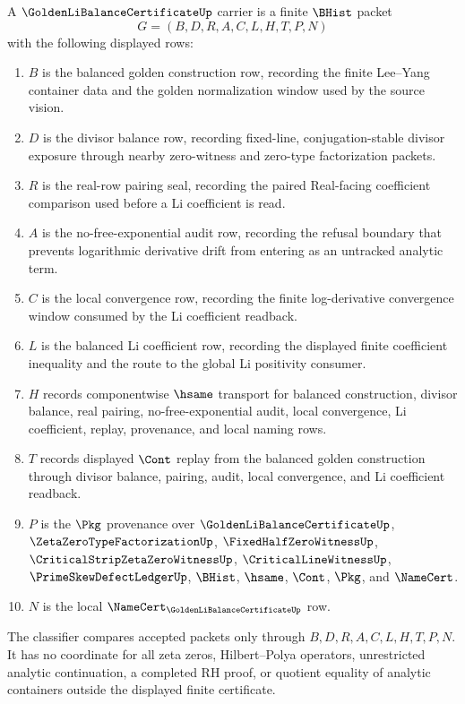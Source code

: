 \begin{definition}
\label{def:golden-li-balance-certificate-carrier}
A $\GoldenLiBalanceCertificateUp$ carrier is a finite $\BHist$ packet
$$
G=(B,D,R,A,C,L,H,T,P,N)
$$
with the following displayed rows:
\begin{enumerate}
\item $B$ is the balanced golden construction row, recording the finite Lee--Yang container data and the golden normalization window used by the source vision.
\item $D$ is the divisor balance row, recording fixed-line, conjugation-stable divisor exposure through nearby zero-witness and zero-type factorization packets.
\item $R$ is the real-row pairing seal, recording the paired Real-facing coefficient comparison used before a Li coefficient is read.
\item $A$ is the no-free-exponential audit row, recording the refusal boundary that prevents logarithmic derivative drift from entering as an untracked analytic term.
\item $C$ is the local convergence row, recording the finite log-derivative convergence window consumed by the Li coefficient readback.
\item $L$ is the balanced Li coefficient row, recording the displayed finite coefficient inequality and the route to the global Li positivity consumer.
\item $H$ records componentwise $\hsame$ transport for balanced construction, divisor balance, real pairing, no-free-exponential audit, local convergence, Li coefficient, replay, provenance, and local naming rows.
\item $T$ records displayed $\Cont$ replay from the balanced golden construction through divisor balance, pairing, audit, local convergence, and Li coefficient readback.
\item $P$ is the $\Pkg$ provenance over $\GoldenLiBalanceCertificateUp$, $\ZetaZeroTypeFactorizationUp$, $\FixedHalfZeroWitnessUp$, $\CriticalStripZetaZeroWitnessUp$, $\CriticalLineWitnessUp$, $\PrimeSkewDefectLedgerUp$, $\BHist$, $\hsame$, $\Cont$, $\Pkg$, and $\NameCert$.
\item $N$ is the local $\NameCert_{\GoldenLiBalanceCertificateUp}$ row.
\end{enumerate}
The classifier compares accepted packets only through $B,D,R,A,C,L,H,T,P,N$. It has no coordinate for all zeta zeros, Hilbert--Polya operators, unrestricted analytic continuation, a completed RH proof, or quotient equality of analytic containers outside the displayed finite certificate.
\end{definition}

